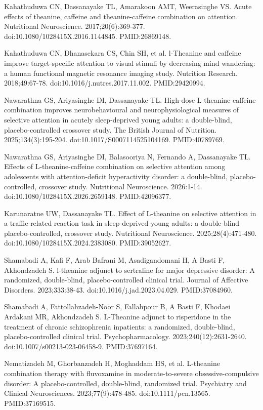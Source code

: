 \documentclass[12pt,oneside]{book}
\newcommand{\reff}[2]{\par\hangindent=7mm\hangafter=1\noindent[#1]\hspace{2mm}#2\par}
\begin{document}
\reff{45}{Kahathuduwa CN, Dassanayake TL, Amarakoon AMT, Weerasinghe VS. Acute effects of theanine, caffeine and theanine-caffeine combination on attention. Nutritional Neuroscience. 2017;20(6):369-377. doi:10.1080/1028415X.2016.1144845. PMID:26869148.}

\reff{46}{Kahathuduwa CN, Dhanasekara CS, Chin SH, et al. l-Theanine and caffeine improve target-specific attention to visual stimuli by decreasing mind wandering: a human functional magnetic resonance imaging study. Nutrition Research. 2018;49:67-78. doi:10.1016/j.nutres.2017.11.002. PMID:29420994.}

\reff{47}{Nawarathna GS, Ariyasinghe DI, Dassanayake TL. High-dose L-theanine-caffeine combination improves neurobehavioural and neurophysiological measures of selective attention in acutely sleep-deprived young adults: a double-blind, placebo-controlled crossover study. The British Journal of Nutrition. 2025;134(3):195-204. doi:10.1017/S0007114525104169. PMID:40789769.}

\reff{48}{Nawarathna GS, Ariyasinghe DI, Balasooriya N, Fernando A, Dassanayake TL. Effects of L-theanine-caffeine combination on selective attention among adolescents with attention-deficit hyperactivity disorder: a double-blind, placebo-controlled, crossover study. Nutritional Neuroscience. 2026:1-14. doi:10.1080/1028415X.2026.2659148. PMID:42096377.}

\reff{49}{Karunaratne UW, Dassanayake TL. Effect of L-theanine on selective attention in a traffic-related reaction task in sleep-deprived young adults: a double-blind placebo-controlled, crossover study. Nutritional Neuroscience. 2025;28(4):471-480. doi:10.1080/1028415X.2024.2383080. PMID:39052627.}

\reff{50}{Shamabadi A, Kafi F, Arab Bafrani M, Asadigandomani H, A Basti F, Akhondzadeh S. l-theanine adjunct to sertraline for major depressive disorder: A randomized, double-blind, placebo-controlled clinical trial. Journal of Affective Disorders. 2023;333:38-43. doi:10.1016/j.jad.2023.04.029. PMID:37084960.}

\reff{51}{Shamabadi A, Fattollahzadeh-Noor S, Fallahpour B, A Basti F, Khodaei Ardakani MR, Akhondzadeh S. L-Theanine adjunct to risperidone in the treatment of chronic schizophrenia inpatients: a randomized, double-blind, placebo-controlled clinical trial. Psychopharmacology. 2023;240(12):2631-2640. doi:10.1007/s00213-023-06458-9. PMID:37697164.}

\reff{52}{Nematizadeh M, Ghorbanzadeh H, Moghaddam HS, et al. L-theanine combination therapy with fluvoxamine in moderate-to-severe obsessive-compulsive disorder: A placebo-controlled, double-blind, randomized trial. Psychiatry and Clinical Neurosciences. 2023;77(9):478-485. doi:10.1111/pcn.13565. PMID:37169515.}
\end{document}
